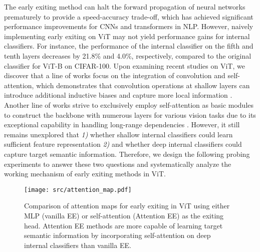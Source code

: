 The early exiting method can halt the forward propagation of neural networks prematurely to provide a speed-accuracy trade-off, 
which has achieved significant performance improvements for CNNs and transformers in NLP. 
However, naively implementing early exiting on ViT may not yield performance gains for internal classifiers. 
For instance, the performance of the internal classifier on the fifth and tenth layers decreases by 21.8\% and 4.0\%, respectively, 
compared to the original classifier for ViT-B\cite{vit} on CIFAR-100\cite{cifar}. 
Upon examining recent studies on ViT, we discover that a line of works focus on the integration of convolution and self-attention, 
which demonstrates that convolution operations at shallow layers can introduce additional inductive biases and capture more local information \cite{vit,acmix}.
Another line of works strive to exclusively employ self-attention as basic modules to construct the backbone with numerous layers for various vision tasks 
due to its exceptional capability in handling long-range dependencies \cite{scale_vit,deeper_vit,how_vit_work}. 
However, it still remains unexplored that 
\textit{1)} whether shallow internal classifiers could learn sufficient feature representation 
\textit{2)} and whether deep internal classifiers could capture target semantic information. 
Therefore, we design the following probing experiments to answer these two questions and systematically analyze the working mechanism of early exiting methods in ViT.

\begin{figure}[h]
  \vspace{-5pt}
  \begin{center}
    \texttt{[image: src/attention\_map.pdf]}
  \end{center}
  \vspace{-5pt}
  \caption{
    Comparison of attention maps for early exiting in ViT using either MLP (vanilla EE) or self-attention (Attention EE) as the exiting head. 
    Attention EE methods are more capable of learning target semantic information by incorporating self-attention on deep internal classifiers than vanilla EE.}
  \label{fig:attention}
  \vspace{-8pt}
\end{figure}



  


